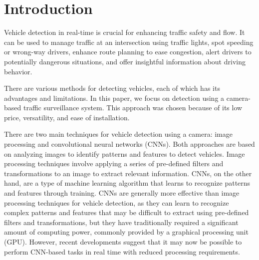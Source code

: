 % 



\newpage

\chapter{Introduction}

Vehicle detection in real-time is crucial for enhancing traffic safety and flow.
It can be used to manage traffic at an intersection using traffic lights, spot
speeding or wrong-way drivers, enhance route planning to ease congestion, alert
drivers to potentially dangerous situations, and offer insightful information
about driving behavior.


There are various methods for detecting vehicles, each of which has
its advantages and limitations. In this paper, we focus on detection using a
camera-based traffic surveillance system. This approach was chosen because of
its low price, versatility, and ease of installation.


There are two main techniques for vehicle detection using a camera: image
processing and convolutional neural networks (CNNs). Both approaches are based
on analyzing images to identify patterns and features to detect vehicles. Image
processing techniques involve applying a series of pre-defined filters and
transformations to an image to extract relevant information. CNNs, on the other
hand, are a type of machine learning algorithm that learns to recognize patterns
and features through training. CNNs are generally more effective than image
processing techniques for vehicle detection, as they can learn to recognize
complex patterns and features that may be difficult to extract using pre-defined
filters and transformations, but they have traditionally required a significant
amount of computing power, commonly provided by a graphical processing
unit (GPU). However, recent developments suggest that it may now be possible to
perform CNN-based tasks in real time with reduced processing requirements. 


